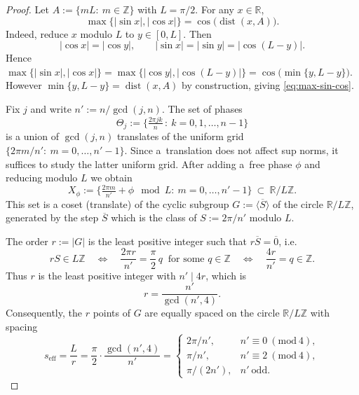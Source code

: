 \documentclass[12pt,fleqn]{amsart}
\theoremstyle{definition}
\theoremstyle{remark}
\newcommand{\1}{\mathbf{1}}
\begin{document}
\begin{proof}
Let $A:=\{mL:\ m\in\mathbb Z\}$ with $L=\pi/2$. For any $x\in\mathbb R$,
\begin{equation}\label{eq:max-sin-cos}
\max\{|\sin x|,|\cos x|\}=\cos\big(\operatorname{dist}(x,A)\big).
\end{equation}
Indeed, reduce $x$ modulo $L$ to $y\in[0,L]$. Then
\[
|\cos x|=|\cos y|,\qquad |\sin x|=|\sin y|=|\cos(L-y)|.
\]
Hence $\max\{|\sin x|,|\cos x|\}=\max\{|\cos y|,|\cos(L-y)|\}=\cos\big(\min\{y,L-y\}\big)$.
However $\min\{y,L-y\}=\operatorname{dist}(x,A)$ by construction, giving \eqref{eq:max-sin-cos}.

\smallskip

Fix $j$ and write $n':=n/\gcd(j,n)$. The set of phases
\[
\Theta_j:=\Big\{\tfrac{2\pi jk}{n}\,:\ k=0,1,\dots,n-1\Big\}
\]
is a union of $\gcd(j,n)$ translates of the uniform grid $\{2\pi m/n':\ m=0,\dots,n'-1\}$. Since a~translation does not affect sup norms, it suffices to study the latter uniform grid. After adding a~free phase $\phi$ and reducing modulo $L$ we obtain
\[
X_\phi:=\Big\{\tfrac{2\pi m}{n'}+\phi\ \bmod L:\ m=0,\dots,n'-1\Big\}\ \subset \ \mathbb R/L\mathbb Z.
\]
This set is a coset (translate) of the cyclic subgroup $G:=\langle \overline{S}\rangle$ of the circle $\mathbb R/L\mathbb Z$, generated by the step $\overline{S}$ which is the class of $S:=2\pi/n'$ modulo $L$.

\smallskip

The order $r:=|G|$ is the least positive integer such that $r\overline{S}=\overline{0}$, i.e.
\[
rS\in L\mathbb Z \quad\Longleftrightarrow\quad \frac{2\pi r}{n'}=\frac{\pi}{2}\,q \ \text{ for some } q\in\mathbb Z
\quad\Longleftrightarrow\quad \frac{4r}{n'}=q\in\mathbb Z.
\]
Thus $r$ is the least positive integer with $n' \mid 4r$, which is
\[
r=\frac{n'}{\gcd(n',4)}.
\]
Consequently, the $r$ points of $G$ are equally spaced on the circle $\mathbb R/L\mathbb Z$ with spacing
\begin{equation}\label{eq:seff}
s_{\mathrm{eff}}=\frac{L}{r}=\frac{\pi}{2}\cdot\frac{\gcd(n',4)}{n'}
=
\begin{cases}
2\pi/n',   & n'\equiv 0\ (\mathrm{mod}\ 4),\\[1mm]
\pi/n',    & n'\equiv 2\ (\mathrm{mod}\ 4),\\[1mm]
\pi/(2n'), & n'\ \text{odd}.
\end{cases}
\end{equation}

\smallskip


\end{proof}
\end{document}
